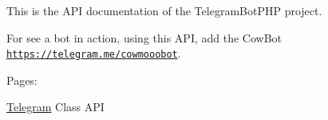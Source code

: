 This is the A\-P\-I documentation of the Telegram\-Bot\-P\-H\-P project.\par
 For see a bot in action, using this A\-P\-I, add the Cow\-Bot \href{https://telegram.me/cowmooobot}{\tt https\-://telegram.\-me/cowmooobot}.\par
 Pages\-:\par
 \hyperlink{class_telegram}{Telegram} Class A\-P\-I \par
 